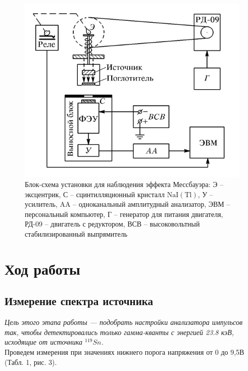 \documentclass[a4paper,12pt]{article} %
\begin{document}
\begin{figure}[h!]
\begin{center}
\includegraphics[scale=0.5]{2} %
\caption{Блок-схема установки для наблюдения эффекта Мессбауэра: Э -- эксцентрик, С -- сцинтилляционный кристалл $\mathrm{NaI}(\mathrm{Tl})$, У -- усилитель, $\mathrm{AA}$ -- одноканальный амплитудный анализатор, ЭВМ -- персональный компьютер, Г -- генератор для питания двигателя, РД-09 -- двигатель с редуктором, ВСВ -- высоковольтный стабилизированный выпрямитель}
\end{center}
\end{figure}	

\section{Ход работы}
\subsection{Измерение спектра источника}

\textit{Цель этого этапа работы — подобрать настройки анализатора импульсов так, чтобы детектировались только гамма-кванты с энергией 23.8 кэВ, исходящие от источника $^{119}Sn$.}\\

\noindent Проведем измерения при значениях нижнего порога напряжения от 0 до 9,5В (Табл. 1, рис. 3).
\end{document}
